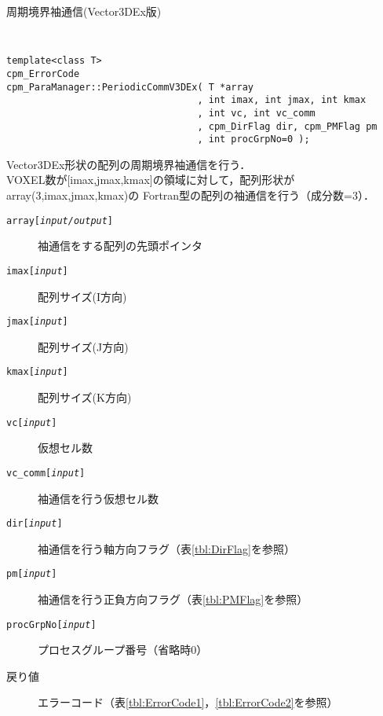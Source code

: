 \begin{spacing}{0.8}
\begin{itembox}[l]{周期境界袖通信(Vector3DEx版)}
{\tt
\begin{verbatim}
template<class T>
cpm_ErrorCode
cpm_ParaManager::PeriodicCommV3DEx( T *array
                                  , int imax, int jmax, int kmax
                                  , int vc, int vc_comm
                                  , cpm_DirFlag dir, cpm_PMFlag pm
                                  , int procGrpNo=0 );
\end{verbatim}
}
Vector3DEx形状の配列の周期境界袖通信を行う．\\
VOXEL数が[imax,jmax,kmax]の領域に対して，配列形状がarray(3,imax,jmax,kmax)の
Fortran型の配列の袖通信を行う（成分数=3）．
\begin{description}
\item[{\tt array[{\it input/output}]}] 袖通信をする配列の先頭ポインタ
\item[{\tt imax[{\it input}]}] 配列サイズ(I方向)
\item[{\tt jmax[{\it input}]}] 配列サイズ(J方向)
\item[{\tt kmax[{\it input}]}] 配列サイズ(K方向)
\item[{\tt vc[{\it input}]}] 仮想セル数
\item[{\tt vc\_comm[{\it input}]}] 袖通信を行う仮想セル数
\item[{\tt dir[{\it input}]}] 袖通信を行う軸方向フラグ（表\ref{tbl:DirFlag}を参照）
\item[{\tt pm[{\it input}]}] 袖通信を行う正負方向フラグ（表\ref{tbl:PMFlag}を参照）
\item[{\tt procGrpNo[{\it input}]}] プロセスグループ番号（省略時0）
\\
\item[戻り値] エラーコード（表\ref{tbl:ErrorCode1}，\ref{tbl:ErrorCode2}を参照）
\end{description}
\end{itembox}\\
\end{spacing}

